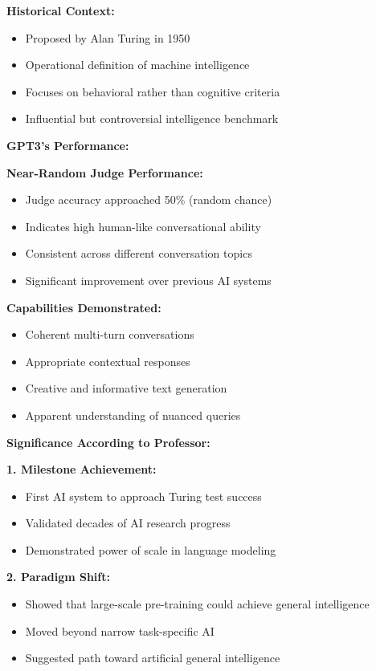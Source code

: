 \documentclass[12pt]{article}
\begin{document}
\begin{enumerate}
\begin{enumerate}[(a)]
{    \textbf{Historical Context:}
    \begin{itemize}
        \item Proposed by Alan Turing in 1950
        \item Operational definition of machine intelligence
        \item Focuses on behavioral rather than cognitive criteria
        \item Influential but controversial intelligence benchmark
    \end{itemize}
    
    \textbf{GPT3's Performance:}
    
    \textbf{Near-Random Judge Performance:}
    \begin{itemize}
        \item Judge accuracy approached 50\% (random chance)
        \item Indicates high human-like conversational ability
        \item Consistent across different conversation topics
        \item Significant improvement over previous AI systems
    \end{itemize}
    
    \textbf{Capabilities Demonstrated:}
    \begin{itemize}
        \item Coherent multi-turn conversations
        \item Appropriate contextual responses
        \item Creative and informative text generation
        \item Apparent understanding of nuanced queries
    \end{itemize}
    
    \textbf{Significance According to Professor:}
    
    \textbf{1. Milestone Achievement:}
    \begin{itemize}
        \item First AI system to approach Turing test success
        \item Validated decades of AI research progress
        \item Demonstrated power of scale in language modeling
    \end{itemize}
    
    \textbf{2. Paradigm Shift:}
    \begin{itemize}
        \item Showed that large-scale pre-training could achieve general intelligence
        \item Moved beyond narrow task-specific AI
        \item Suggested path toward artificial general intelligence
    \end{itemize}
    
}
\end{enumerate}
\end{enumerate}
\end{document}
